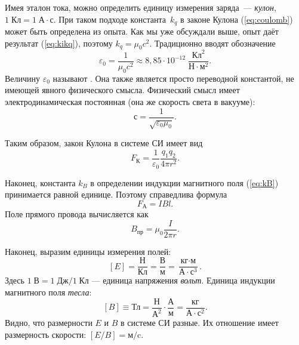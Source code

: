 Имея эталон тока, можно определить единицу измерения заряда~--- \emph{кулон},
$1\;\text{Кл}=1\;\text{А}\cdot\text{с}$. При таком подходе константа~$k_{q}$ в законе Кулона (\ref{eq:coulomb}) может быть определена
из опыта. Как мы уже обсуждали выше, опыт даёт результат (\ref{eq:kikq}),
поэтому $k_{q}=\mu_{0}c^{2}$. Традиционно вводят обозначение
\begin{equation}
\varepsilon_{0}=\frac{1}{\mu_{0}c^{2}}\approx8{,}85\cdot10^{-12}\;\frac{\text{Кл}^{2}}{\text{Н}\cdot\text{м}^{2}}.
\end{equation}
Величину $\varepsilon_{0}$ называют .
Она также является просто переводной константой, не имеющей
явного физического смысла. Физический смысл имеет электродинамическая
постоянная (она же скорость
света в вакууме):
\[
с = \frac{1}{\sqrt{\varepsilon_{0}\mu_{0}}}.
\]


Таким образом, закон Кулона в системе СИ имеет вид
\begin{equation}
F_{\text{К}}=\frac{1}{\varepsilon_{0}}\frac{q_{1}q_{2}}{4\pi r^{2}}.
\end{equation}

Наконец, константа $k_{B}$ в определении индукции магнитного поля
(\ref{eq:kB}) принимается равной единице. Поэтому справедлива формула
\begin{equation}
F_{\text{А}}=IBl.
\end{equation}
Поле прямого провода вычисляется как
\[
B_{\text{пр}}=\mu_{0}\dfrac{I}{2\pi r}.
\]

Наконец, выразим единицы измерения полей:
\[
\left[E\right]=\frac{\text{Н}}{\text{Кл}}=\frac{\text{В}}{\text{м}}=\frac{\text{кг}\cdot\text{м}}{\text{А}\cdot\text{с}^{3}}.
\]
Здесь $1\;\text{В}=1\;\text{Дж}/1\;\text{Кл}$ --- единица напряжения
\emph{вольт}. Единица индукции магнитного поля \emph{тесла}:
\[
\left[B\right]\equiv\text{Тл}=\frac{\text{Н}}{\text{А}^{2}}\cdot\frac{\text{А}}{\text{м}}=\frac{\text{кг}}{\text{А}\cdot\text{с}^{2}}.
\]
Видно, что размерности $E$ и $B$ в системе СИ разные. Их отношение имеет размерность
скорости: $\left[E/B\right]=\text{м/c}$.

